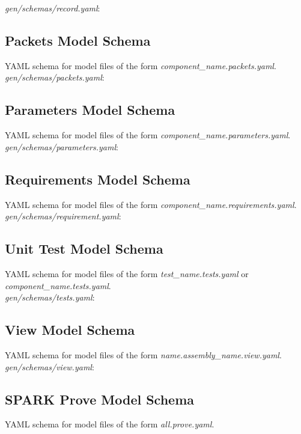 \begin{appendices}
\textit{gen/schemas/record.yaml}:

\subsection{Packets Model Schema}
YAML schema for model files of the form \textit{component\_name.packets.yaml}. \\

\textit{gen/schemas/packets.yaml}:

\subsection{Parameters Model Schema}
YAML schema for model files of the form \textit{component\_name.parameters.yaml}. \\

\textit{gen/schemas/parameters.yaml}:

\subsection{Requirements Model Schema}
YAML schema for model files of the form \textit{component\_name.requirements.yaml}. \\

\textit{gen/schemas/requirement.yaml}:

\subsection{Unit Test Model Schema}
YAML schema for model files of the form \textit{test\_name.tests.yaml} or \textit{component\_name.tests.yaml}. \\

\textit{gen/schemas/tests.yaml}:

\subsection{View Model Schema}
YAML schema for model files of the form \textit{name.assembly\_name.view.yaml}. \\

\textit{gen/schemas/view.yaml}:

\subsection{SPARK Prove Model Schema}
YAML schema for model files of the form \textit{all.prove.yaml}. \\


\end{appendices}
